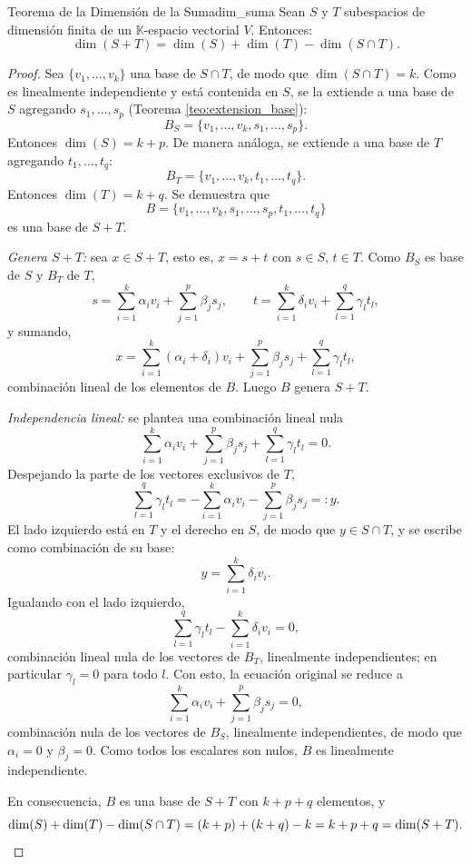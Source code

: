 \documentclass[11pt, a4paper]{article}
\begin{document}
\begin{teorema}{Teorema de la Dimensión de la Suma}{dim_suma}
Sean $S$ y $T$ subespacios de dimensión finita de un $\mathbb{K}$-espacio vectorial $V$. Entonces:
\[
\dim(S+T) = \dim(S) + \dim(T) - \dim(S \cap T).
\]
\end{teorema}

\begin{proof}
Sea $\{v_1, \dots, v_k\}$ una base de $S \cap T$, de modo que $\dim(S \cap T) = k$. Como es linealmente independiente y está contenida en $S$, se la extiende a una base de $S$ agregando $s_1, \dots, s_p$ (Teorema \ref{teo:extension_base}):
\[
B_S = \{v_1, \dots, v_k, s_1, \dots, s_p\}.
\]
Entonces $\dim(S) = k + p$. De manera análoga, se extiende a una base de $T$ agregando $t_1, \dots, t_q$:
\[
B_T = \{v_1, \dots, v_k, t_1, \dots, t_q\}.
\]
Entonces $\dim(T) = k + q$. Se demuestra que
\[
B = \{v_1, \dots, v_k, s_1, \dots, s_p, t_1, \dots, t_q\}
\]
es una base de $S+T$.

\textit{Genera $S+T$:} sea $x \in S+T$, esto es, $x = s + t$ con $s \in S$, $t \in T$. Como $B_S$ es base de $S$ y $B_T$ de $T$,
\[
s = \sum_{i=1}^{k} \alpha_i v_i + \sum_{j=1}^{p} \beta_j s_j, \qquad
t = \sum_{i=1}^{k} \delta_i v_i + \sum_{l=1}^{q} \gamma_l t_l,
\]
y sumando,
\[
x = \sum_{i=1}^{k} (\alpha_i + \delta_i) v_i + \sum_{j=1}^{p} \beta_j s_j + \sum_{l=1}^{q} \gamma_l t_l,
\]
combinación lineal de los elementos de $B$. Luego $B$ genera $S+T$.

\textit{Independencia lineal:} se plantea una combinación lineal nula
\[
\sum_{i=1}^k \alpha_i v_i + \sum_{j=1}^p \beta_j s_j + \sum_{l=1}^q \gamma_l t_l = 0.
\]
Despejando la parte de los vectores exclusivos de $T$,
\[
\sum_{l=1}^q \gamma_l t_l = - \sum_{i=1}^k \alpha_i v_i - \sum_{j=1}^p \beta_j s_j =: y.
\]
El lado izquierdo está en $T$ y el derecho en $S$, de modo que $y \in S \cap T$, y se escribe como combinación de su base:
\[
y = \sum_{i=1}^k \delta_i v_i.
\]
Igualando con el lado izquierdo,
\[
\sum_{l=1}^q \gamma_l t_l - \sum_{i=1}^k \delta_i v_i = 0,
\]
combinación lineal nula de los vectores de $B_T$, linealmente independientes; en particular $\gamma_l = 0$ para todo $l$. Con esto, la ecuación original se reduce a
\[
\sum_{i=1}^k \alpha_i v_i + \sum_{j=1}^p \beta_j s_j = 0,
\]
combinación nula de los vectores de $B_S$, linealmente independientes, de modo que $\alpha_i = 0$ y $\beta_j = 0$. Como todos los escalares son nulos, $B$ es linealmente independiente.

En consecuencia, $B$ es una base de $S+T$ con $k + p + q$ elementos, y
\[
\dim(S) + \dim(T) - \dim(S \cap T) = (k+p) + (k+q) - k = k + p + q = \dim(S+T). \qedhere
\]
\end{proof}
\end{document}
